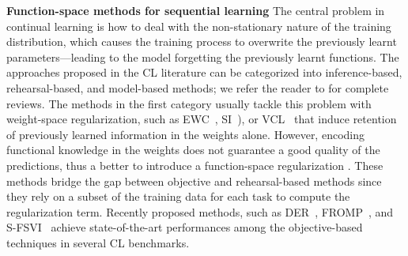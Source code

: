 \documentclass{article}
\makeatletter
\newcommand{\eg}{\textit{e.g.\@}\xspace}
\makeatother
\begin{document}
\textbf{Function-space methods for sequential learning} The central problem in continual learning is how to deal with the non-stationary nature of the training distribution, which causes the training process to overwrite the previously learnt parameters---leading to the model forgetting the previously learnt functions. 
The approaches proposed in the CL literature can be categorized into inference-based, rehearsal-based, and model-based methods; we refer the reader to \citep{parisi2019continual, de2021continual} for complete reviews. The methods in the first category usually tackle this problem with weight-space regularization, such as EWC~\citep{kirkpatrick2017overcoming}, SI~\citep{zenke17a}), or VCL~\citep{nguyen-tuongModel2009} that induce retention of previously learned information in the weights alone.
However, encoding functional knowledge in the weights does not guarantee a good quality of the predictions, thus a better to introduce a function-space regularization \citep{li2018lwf, benjamin2018measuring, titsias2019functional, buzzega2020dark, pan2020continual, rudner2022continual}. These methods bridge the gap between objective and rehearsal-based methods since they rely on a subset of the training data for each task to compute the regularization term. Recently proposed methods, such as DER~\citep{buzzega2020dark}, FROMP~\citep{pan2020continual}, and S-FSVI~\citep{rudner2022continual} achieve state-of-the-art performances among the objective-based techniques in several CL benchmarks. 





\end{document}
